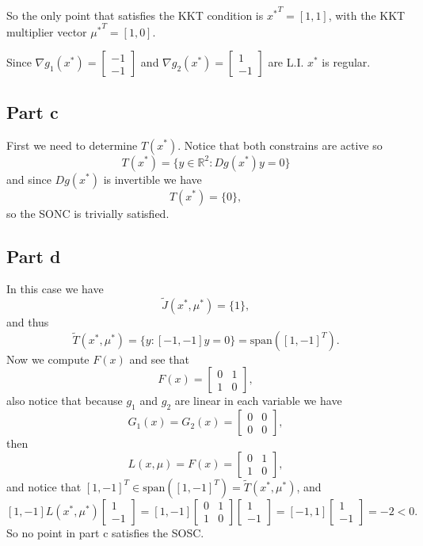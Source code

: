 \documentclass{article}
\begin{document}
So the only point that satisfies the KKT condition is ${x^*}^T=[1,1]$, with the
KKT multiplier vector ${\mu^*}^T=[1,0]$.

Since $\nabla g_1(x^*)=\begin{bmatrix} -1\\-1\end{bmatrix}$ and $\nabla
g_2(x^*)=\begin{bmatrix} 1\\-1\end{bmatrix}$ are L.I. $x^*$ is regular.
\subsection*{Part c}
First we need to determine $T(x^*)$. Notice that both constrains are active so
\[
	T(x^*)=\{y\in \mathbb{R}^2:Dg(x^*)y=0\}
\]
and since $Dg(x^*)$ is invertible we have
\[
	T(x^*)=\{0\},
\]
so the SONC is trivially satisfied.
\subsection*{Part d}
In this case we have
\[
	\tilde{J}(x^*,\mu^*)=\{1\},
\]
and thus
\[
	\tilde{T}(x^*,\mu^*)=\{y:[-1,-1]y=0\}=\text{span}([1,-1]^T).
\]
Now we compute $F(x)$ and see that
\[
	F(x)=\begin{bmatrix}
		0 & 1\\	
		1 & 0
	\end{bmatrix},
\]
also notice that because $g_1$ and $g_2$ are linear in each variable we have
\[
G_1(x)=G_2(x)=\begin{bmatrix}
	0 & 0\\	
	0 & 0
\end{bmatrix},
\]
then
\[
L(x,\mu)= F(x)=\begin{bmatrix}
		0 & 1\\	
		1 & 0
	\end{bmatrix},
\]
and notice that $[1,-1]^T\in\text{span}([1,-1]^T)=\tilde{T}(x^*,\mu^*)$, and
\[
	[1,-1]L(x^*,\mu^*)\begin{bmatrix}
1\\	
-1
\end{bmatrix}=
[1,-1]
\begin{bmatrix}
0 & 1\\	
1 & 0
\end{bmatrix}
\begin{bmatrix}
1\\	
-1
\end{bmatrix}=
[-1,1]\begin{bmatrix}
1\\	
-1
\end{bmatrix}=-2<0.
\]
So no point in part c satisfies the SOSC.
\end{document}
